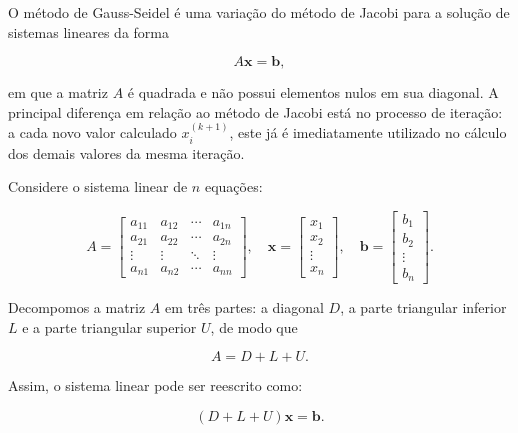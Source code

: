 O método de Gauss-Seidel é uma variação do método de Jacobi para a solução de sistemas lineares da forma

        \[
        A \mathbf{x} = \mathbf{b},
        \]
        
        \noindent em que a matriz $A$ é quadrada e não possui elementos nulos em sua diagonal. A principal diferença em relação ao método de Jacobi está no processo de iteração: a cada novo valor calculado $x_i^{(k+1)}$, este já é imediatamente utilizado no cálculo dos demais valores da mesma iteração.
        
        \medskip
        
        Considere o sistema linear de $n$ equações:
        
        \[
        A =
        \begin{bmatrix}
        a_{11} & a_{12} & \cdots & a_{1n} \\
        a_{21} & a_{22} & \cdots & a_{2n} \\
        \vdots & \vdots & \ddots & \vdots \\
        a_{n1} & a_{n2} & \cdots & a_{nn}
        \end{bmatrix},
        \quad
        \mathbf{x} =
        \begin{bmatrix}
        x_{1} \\
        x_{2} \\
        \vdots \\
        x_{n}
        \end{bmatrix},
        \quad
        \mathbf{b} =
        \begin{bmatrix}
        b_{1} \\
        b_{2} \\
        \vdots \\
        b_{n}
        \end{bmatrix}.
        \]
        
        Decompomos a matriz $A$ em três partes: a diagonal $D$, a parte triangular inferior $L$ e a parte triangular superior $U$, de modo que
        
        \[
        A = D + L + U.
        \]
        
        Assim, o sistema linear pode ser reescrito como:
        
        \begin{equation}
        (D + L + U)\mathbf{x} = \mathbf{b}.
        \label{eq:Sistema_GS}
        \end{equation}
        
